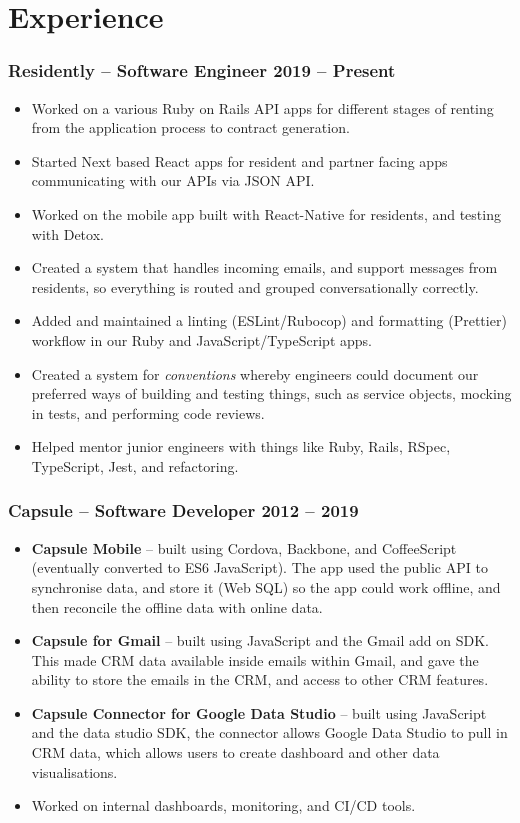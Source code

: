 \documentclass[a4paper]{article}
\newcommand{\datedsubsection}[2]{
  \subsubsection{#1 \hfill \textbf{#2}}
}
\begin{document}
\section{Experience}
\datedsubsection{\textbf{Residently} -- Software Engineer}{2019 -- Present}
\begin{itemize}
  \item Worked on a various Ruby on Rails API apps for different stages of renting from the application process to contract generation.
  \item Started Next based React apps for resident and partner facing apps communicating with our APIs via JSON API.
  \item Worked on the mobile app built with React-Native for residents, and testing with Detox.
  \item Created a system that handles incoming emails, and support messages from residents, so everything is routed and grouped conversationally correctly. 
  \item Added and maintained a linting (ESLint/Rubocop) and formatting (Prettier) workflow in our Ruby and JavaScript/TypeScript apps.
  \item Created a system for \textit{conventions} whereby engineers could document our preferred ways of building and testing things, such as service objects, mocking in tests, and performing code reviews.
  \item Helped mentor junior engineers with things like Ruby, Rails, RSpec, TypeScript, Jest, and refactoring.
\end{itemize}
\datedsubsection{\textbf{Capsule} -- Software Developer}{2012 -- 2019}
\begin{itemize}
  \item \textbf{Capsule Mobile} -- built using Cordova, Backbone, and CoffeeScript (eventually converted to ES6 JavaScript). The app used the public API to synchronise data, and store it (Web SQL) so the app could work offline, and then reconcile the offline data with online data.
  \item \textbf{Capsule for Gmail} -- built using JavaScript and the Gmail add on SDK. This made CRM  data available inside emails within Gmail, and gave the ability to store the emails in the CRM, and access to other CRM features.
  \item \textbf{Capsule Connector for Google Data Studio} -- built using JavaScript and the data studio SDK, the connector allows Google Data Studio to pull in CRM data, which allows users to create dashboard and other data visualisations.
  \item Worked on internal dashboards, monitoring, and CI/CD tools.
\end{itemize}
\end{document}
